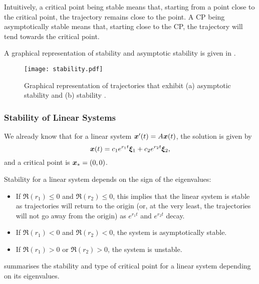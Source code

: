 Intuitively, a critical point being stable means that, starting from a point close to the critical point, the trajectory remains close to the point. A CP being asymptotically stable means that, starting close to the CP, the trajectory will tend towards the critical point.

A graphical representation of stability and asymptotic stability is given in .

\begin{figure}[!ht]
	\centering
	\texttt{[image: stability.pdf]}
	\caption{Graphical representation of trajectories that exhibit (a) asymptotic stability and (b) stability \cite[Figure 9.2.1]{boyce}.}
	\label{fig:stability}
\end{figure}

\subsubsection{Stability of Linear Systems}

We already know that for a linear system $\bm{x}'(t) = A\bm{x}(t)$, the solution is given by
\[
\bm{x}(t) = c_1e^{r_1t}\bm{\xi}_1 + c_2e^{r_2t}\bm{\xi}_2,
\]
and a critical point is $\bm{x}_{\ast} = (0,0)$.

Stability for a linear system depends on the sign of the eigenvalues:
\begin{itemize}
	\item If $\Re(r_1) \leq 0$ and $\Re(r_2) \leq 0$, this implies that the linear system is stable as trajectories will return to the origin (or, at the very least, the trajectories will not go away from the origin) as $e^{r_1t}$ and $e^{r_2t}$ decay.
	\item If $\Re(r_1)<0$ and $\Re(r_2)<0$, the system is asymptotically stable.
	\item If $\Re(r_1)>0$ or $\Re(r_2)>0$, the system is unstable.
\end{itemize}

 summarises the stability and type of critical point for a linear system depending on its eigenvalues.

